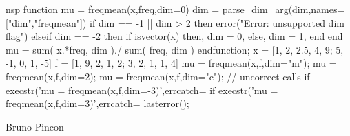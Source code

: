 \begin{examples}

\begin{mintednsp}{nsp}
function mu = freqmean(x,freq,dim=0)
   dim = parse_dim_arg(dim,names=["dim","freqmean"])
   if dim == -1 || dim > 2 then
      error("Error: unsupported dim flag")
   elseif dim == -2 then
      if isvector(x) then, dim = 0, else, dim = 1, end
   end
   mu = sum( x.*freq, dim )./ sum( freq, dim )
endfunction;
x = [1, 2, 2.5, 4, 9; 5, -1, 0, 1, -5]
f = [1, 9, 2,   1, 2; 3,  2, 1, 1,  4]
mu = freqmean(x,f,dim="m");
mu = freqmean(x,f,dim=2);
mu = freqmean(x,f,dim="c");
// uncorrect calls
if execstr('mu = freqmean(x,f,dim=-3)',errcatch=%
if execstr('mu = freqmean(x,f,dim=3)',errcatch=%
lasterror();
\end{mintednsp}
\end{examples}

\begin{manseealso}
\end{manseealso}

\begin{authors}
  Bruno Pincon
\end{authors}


